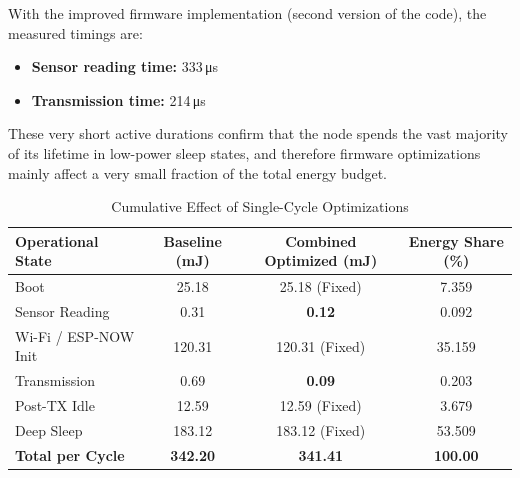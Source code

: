 \documentclass[11pt,a4paper]{article}
\begin{document}
With the improved firmware implementation (second version of the code), the measured timings are:

\begin{itemize}
    \item \textbf{Sensor reading time:} 333\,\si{\micro\second}
    \item \textbf{Transmission time:} 214\,\si{\micro\second}
\end{itemize}

These very short active durations confirm that the node spends the vast majority of its lifetime in low-power sleep states, and therefore firmware optimizations mainly affect a very small fraction of the total energy budget.
\begin{table}[h!]
\centering
\caption{Cumulative Effect of Single-Cycle Optimizations}
\label{tab:combined_opt}
\begin{tabular}{lccc}
\hline
\textbf{Operational State} & \textbf{Baseline (mJ)} & \textbf{Combined Optimized (mJ)} & \textbf{Energy Share (\%)} \\ \hline
Boot                       & 25.18                  & 25.18 (Fixed)                    & 7.359                      \\
Sensor Reading             & 0.31                   & \textbf{0.12}                    & 0.092                      \\
Wi-Fi / ESP-NOW Init       & 120.31                 & 120.31 (Fixed)                   & 35.159                     \\
Transmission               & 0.69                   & \textbf{0.09}                    & 0.203                      \\
Post-TX Idle               & 12.59                  & 12.59 (Fixed)                    & 3.679                      \\
Deep Sleep                 & 183.12                 & 183.12 (Fixed)                   & 53.509                     \\ \hline
\textbf{Total per Cycle}   & \textbf{342.20}        & \textbf{341.41}                  & \textbf{100.00}            \\ \hline
\end{tabular}
\end{table}
\end{document}
